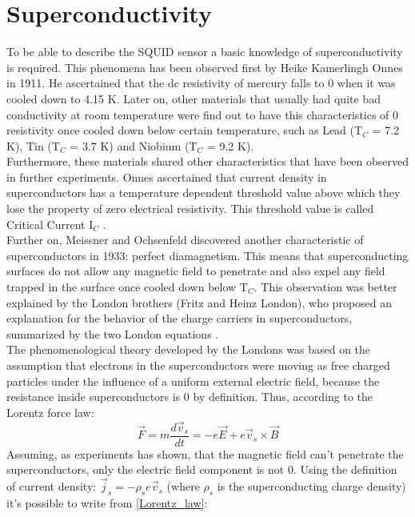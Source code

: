 \documentclass[12pt,a4paper]{report}
\begin{document}
	\section{Superconductivity}
	To be able to describe the SQUID sensor a basic knowledge of superconductivity is required. This phenomena has been observed first by Heike Kamerlingh Onnes in 1911. He ascertained that the dc resistivity of mercury falls to 0 when it was cooled down to 4.15 K. Later on, other materials that usually had quite bad conductivity at room temperature were find out to have this characteristics of 0 resistivity once cooled down below certain temperature, such as Lead (T$_C$ = 7.2 K), Tin (T$_C$ = 3.7 K) and Niobium (T$_C$ = 9.2 K).\\
	Furthermore, these materials shared other characteristics that have been observed in further experiments. Onnes ascertained that current density in superconductors has a temperature dependent threshold value above which they lose the property of zero electrical resistivity. This threshold value is called Critical Current I$_C$ \cite{Critical_current}.\\
	Further on, Meissner and Ochsenfeld discovered another characteristic of superconductors in 1933: perfect diamagnetism. This means that superconducting surfaces do not allow any magnetic field to penetrate and also expel any field trapped in the surface once cooled down below T$_C$. This observation was better explained by the London brothers (Fritz and Heinz London), who proposed an explanation for the behavior of the charge carriers in superconductors, summarized by the two London equations \cite{London_SC}.\\
	The phenomenological theory developed by the Londons was based on the assumption that electrons in the superconductors were moving as free charged particles under the influence of a uniform external electric field, because the resistance inside superconductors is 0 by definition. Thus, according to the Lorentz force law:
	\begin{equation}
		\overrightarrow{F} = m \frac{d\overrightarrow{v}_s}{dt} = -e\overrightarrow{E} + e \overrightarrow{v}_s \times \overrightarrow{B}
		\label{Lorentz_law}
	\end{equation}
    Assuming, as experiments has shown, that the magnetic field can't penetrate the superconductors, only the electric field component is not 0. Using the definition of current density: $\overrightarrow{j}_s = -\rho_s e \overrightarrow{v}_s$ (where $\rho_s$ is the superconducting charge density) it's possible to write from \ref{Lorentz_law}:
\end{document}
